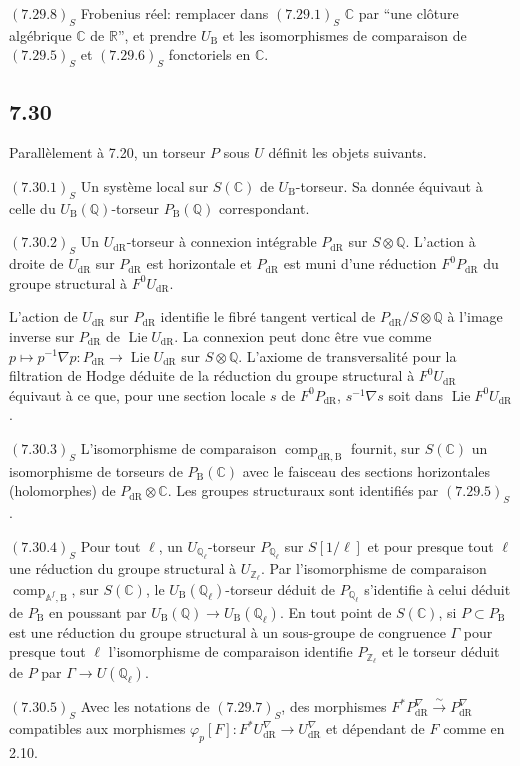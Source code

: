 \documentclass[12pt,a4paper]{article}
\theoremstyle{plain}
\theoremstyle{definition}
\theoremstyle{remark}
\DeclareMathOperator{\Lie}{Lie}
\DeclareMathOperator{\comp}{comp}
\newcommand{\DR}{\mathrm{dR}}
\newcommand{\B}{\mathrm{B}}
\newcommand{\Z}{\mathbb{Z}}
\newcommand{\Q}{\mathbb{Q}}
\newcommand{\C}{\mathbb{C}}
\newcommand{\R}{\mathbb{R}}
\newcommand{\A}{\mathbb{A}}
\begin{document}
$(7.29.8)_S$ Frobenius r\'eel: remplacer dans $(7.29.1)_S$ $\C$ par ``une cl\^oture alg\'ebrique $\C$ de $\R$'', et prendre $U_\B$ et les isomorphismes de comparaison de $(7.29.5)_S$ et $(7.29.6)_S$ fonctoriels en $\C$.

\subsection*{7.30}
Parall\`element \`a 7.20, un torseur $P$ sous $U$ d\'efinit les objets suivants.

$(7.30.1)_S$ Un syst\`eme local sur $S(\C)$ de $U_\B$-torseur. Sa donn\'ee \'equivaut \`a celle du $U_\B(\Q)$-torseur $P_\B(\Q)$ correspondant.

$(7.30.2)_S$ Un $U_\DR$-torseur \`a connexion int\'egrable $P_\DR$ sur $S \otimes \Q$. L'action \`a droite de $U_\DR$ sur $P_\DR$ est horizontale et $P_\DR$ est muni d'une r\'eduction $F^0P_\DR$ du groupe structural \`a $F^0U_\DR$.

L'action de $U_\DR$ sur $P_\DR$ identifie le fibr\'e tangent vertical de $P_\DR/S \otimes \Q$ \`a l'image inverse sur $P_\DR$ de $\Lie U_\DR$. La connexion peut donc \^etre vue comme $p \mapsto p^{-1}\nabla p: P_\DR \to \Lie U_\DR$ sur $S \otimes \Q$. L'axiome de transversalit\'e pour la filtration de Hodge d\'eduite de la r\'eduction du groupe structural \`a $F^0U_\DR$ \'equivaut \`a ce que, pour une section locale $s$ de $F^0P_\DR$, $s^{-1}\nabla s$ soit dans $\Lie F^0U_\DR$.

$(7.30.3)_S$ L'isomorphisme de comparaison $\comp_{\DR,\B}$ fournit, sur $S(\C)$ un isomorphisme de torseurs de $P_\B(\C)$ avec le faisceau des sections horizontales (holomorphes) de $P_\DR \otimes \C$. Les groupes structuraux sont identifi\'es par $(7.29.5)_S$.

$(7.30.4)_S$ Pour tout $\ell$, un $U_{\Q_\ell}$-torseur $P_{\Q_\ell}$ sur $S[1/\ell]$ et pour presque tout $\ell$ une r\'eduction du groupe structural \`a $U_{\Z_\ell}$. Par l'isomorphisme de comparaison $\comp_{\A^f,\B}$, sur $S(\C)$, le $U_\B(\Q_\ell)$-torseur d\'eduit de $P_{\Q_\ell}$ s'identifie \`a celui d\'eduit de $P_\B$ en poussant par $U_\B(\Q) \to U_\B(\Q_\ell)$. En tout point de $S(\C)$, si $P \subset P_\B$ est une r\'eduction du groupe structural \`a un sous-groupe de congruence $\Gamma$ pour presque tout $\ell$ l'isomorphisme de comparaison identifie $P_{\Z_\ell}$ et le torseur d\'eduit de $P$ par $\Gamma \to U(\Q_\ell)$.

$(7.30.5)_S$ Avec les notations de $(7.29.7)_S$, des morphismes $F^*P^{\nabla}_\DR \xrightarrow{\sim} P^{\nabla}_\DR$ compatibles aux morphismes $\varphi_p[F]: F^*U^{\nabla}_\DR \to U^{\nabla}_\DR$ et d\'ependant de $F$ comme en 2.10.
\end{document}
